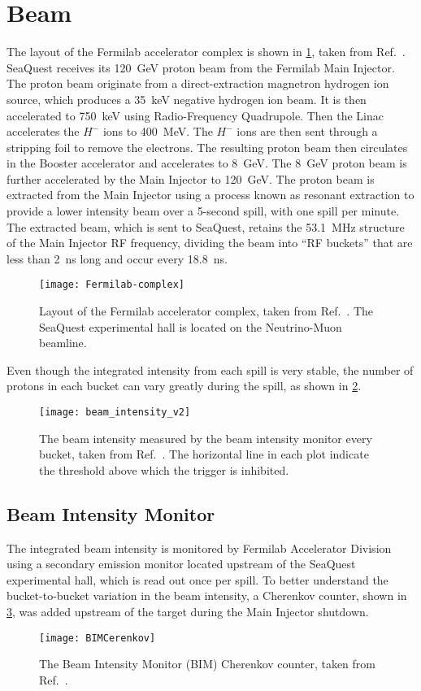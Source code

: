 \documentclass[../main.tex]{subfiles}
\begin{document}
\section{Beam}
The layout of the Fermilab accelerator complex is shown in \cref{fig:complex},
taken from Ref.~\cite{concept-book}.
SeaQuest receives its \SI{120}{\GeV} proton beam from the Fermilab Main Injector.
The proton beam originate from a direct-extraction magnetron hydrogen ion source,
which produces a \SI{35}{\keV} negative hydrogen ion beam. It is then accelerated
to \SI{750}{\keV} using Radio-Frequency Quadrupole. Then the Linac accelerates the
$H^-$ ions to \SI{400}{\MeV}. The $H^-$ ions are then sent through a stripping foil
to remove the electrons. The resulting proton beam then circulates in the Booster
accelerator and accelerates to \SI{8}{\GeV}. The \SI{8}{\GeV} proton beam is
further accelerated by the Main Injector to \SI{120}{\GeV}. The proton beam is
extracted from the Main Injector using a process known as resonant extraction to
provide a lower intensity beam over a 5-second spill, with one spill per minute. The extracted beam, which
is sent to SeaQuest, retains the \SI{53.1}{\MHz} structure of the Main
Injector RF frequency, dividing the beam into ``RF buckets'' that are less than
\SI{2}{\ns} long and occur every \SI{18.8}{\ns}.
\begin{figure}[htbp!]
	\centering
	\texttt{[image: Fermilab-complex]}
	\caption{Layout of the Fermilab accelerator complex, taken from Ref.~\cite{concept-book}. The
		SeaQuest experimental hall is located on the Neutrino-Muon beamline.}
	\label{fig:complex}
\end{figure}
Even though the integrated intensity from each spill is very stable,
the number of protons in each bucket can vary greatly during the spill, as
shown in \cref{fig:intensity}.
\begin{figure}[htpb!]
	\centering
	\texttt{[image: beam\_intensity\_v2]}
	\caption{The beam intensity measured by the beam intensity monitor every
		bucket, taken from Ref.~\cite{aidala2019}. The horizontal line in each plot
		indicate the threshold above which the trigger is inhibited.}
	\label{fig:intensity}
\end{figure}

\subsection{Beam Intensity Monitor}
\label{subsec:BIM}
The integrated beam intensity is monitored by Fermilab Accelerator Division using a
secondary emission monitor located upstream of the SeaQuest experimental hall, which
is read out once per spill.
To better understand the bucket-to-bucket variation in the beam intensity, a Cherenkov  counter,
shown in \cref{fig:BIM}, was added upstream of the target during the Main Injector shutdown.
\begin{figure}[htbp!]
	\centering
	\texttt{[image: BIMCerenkov]}
	\caption{The Beam Intensity Monitor (BIM) Cherenkov counter, taken from Ref.~\cite{aidala2019}.}
	\label{fig:BIM}
\end{figure}
\end{document}
